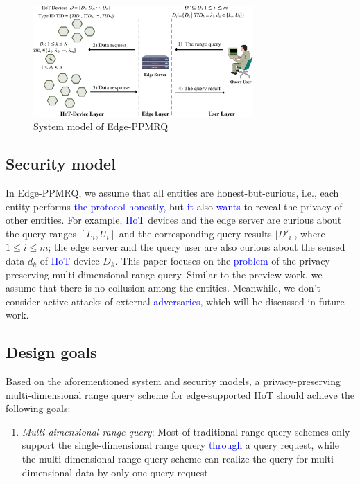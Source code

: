 \documentclass[IEEE JOURNAL OF BIOMEDICAL AND HEALTH INFORMATICS]{IEEEtran}
\begin{document}
{\begin{figure}
  \centering
  \includegraphics[width=3.3in]{system_model}
  \caption{System model of Edge-PPMRQ}\label{system model}
\end{figure}

\subsection{Security model}
In Edge-PPMRQ, we assume that all entities are honest-but-curious, i.e., each entity performs \textcolor{blue}{the protocol honestly,} but \textcolor{blue}{it} also \textcolor{blue}{wants} to reveal the privacy of other entities. For example, \textcolor{blue}{IIoT} devices and the edge server are curious about the query ranges $[L_i, U_i]$ and the corresponding query results $|D'_i|$, where $1 \le i \le m$; the edge server and the query user are also curious about the sensed data $d_k$ of \textcolor{blue}{IIoT} device $D_k$. This paper focuses on  the \textcolor{blue}{problem} of the privacy-preserving multi-dimensional range query. Similar to the preview work, we assume that there is no collusion among the entities. Meanwhile, we don't consider active attacks of external \textcolor{blue}{adversaries}, which will be discussed in future work.

\subsection{Design goals}
Based on the aforementioned system and security models, a privacy-preserving multi-dimensional range query scheme for edge-supported IIoT should achieve the following goals:
\begin{enumerate}

	\item \emph{Multi-dimensional range query}: Most of traditional range query schemes only support the single-dimensional range query \textcolor{blue}{through} a query request, while the multi-dimensional range query scheme can realize the query for multi-dimensional data by only one query request.


\end{enumerate}}
\end{document}
